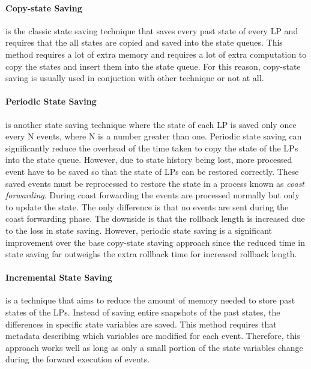 \documentclass[11pt]{book}
\begin{document}
\paragraph{Copy-state Saving} is the classic state saving technique that saves every past
state of every LP and requires that the all states are copied and saved into the state queues.
This method requires a lot of extra memory and requires a lot of extra computation to copy
the states and insert them into the state queue. For this reason, copy-state saving is
usually used in conjuction with other technique or not at all.

\paragraph{Periodic State Saving} is another state saving technique where the state of each LP
is saved only once every N events, where N is a number greater than one. Periodic state
saving can significantly reduce the overhead of the time taken to copy the state of the
LPs into the state queue. However, due to state history being lost, more processed event
have to be saved so that the state of LPs can be restored correctly. These saved events
must be reprocessed to restore the state in a process known as \emph{coast forwarding}.
During coast forwarding the events are processed normally but only to update the state.
The only difference is that no events are sent during the coast forwarding phase. The
downside is that the rollback length is increased due to the loss in state saving. However,
periodic state saving is a significant improvement over the base copy-state staving approach
since the reduced time in state saving far outweighs the extra rollback time for increased
rollback length.

\paragraph{Incremental State Saving} is a technique that aims to reduce the amount of
memory needed to store past states of the LPs. Instead of saving entire snapshots of the
past states, the differences in specific state variables are saved. This method requires
that metadata describing which variables are modified for each event. Therefore, this approach
works well as long as only a small portion of the state variables change during the forward
execution of events.
\end{document}
